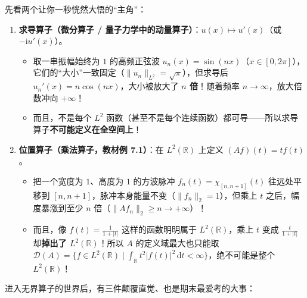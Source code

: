 \documentclass[11pt,a4paper]{article}
\providecommand{\tightlist}{\setlength{\itemsep}{1.8pt}\setlength{\parskip}{0pt}}
\begin{document}
先看两个让你一秒恍然大悟的``主角''：

\begin{enumerate}
\def\labelenumi{\arabic{enumi}.}
\tightlist
\item
  \textbf{求导算子（微分算子 / 量子力学中的动量算子）}：\(u(x) \mapsto u'(x)\)（或 \(-\mathrm{i} u'(x)\)）。

  \begin{itemize}
  \tightlist
  \item
    取一串振幅始终为 \(1\) 的高频正弦波 \(u_n(x) = \sin(nx)\)（\(x \in [0, 2\pi]\)），它们的``大小''一致固定（\(\|u_n\|_{L^2} = \sqrt{\pi}\)），但求导后 \(u_n'(x) = n\cos(nx)\)，大小被放大了 \textbf{\(n\) 倍}！随着频率 \(n \to \infty\)，放大倍数冲向 \(+\infty\)！
  \item
    而且，不是每个 \(L^2\) 函数（甚至不是每个连续函数）都可导——所以求导算子\textbf{不可能定义在全空间上}！
  \end{itemize}
\item
  \textbf{位置算子（乘法算子，教材例 7.1）}：在 \(L^2(\mathbb{R})\) 上定义 \((Af)(t) = t f(t)\)。

  \begin{itemize}
  \tightlist
  \item
    把一个宽度为 \(1\)、高度为 \(1\) 的方波脉冲 \(f_n(t) = \chi_{[n, n+1]}(t)\) 往远处平移到 \([n, n+1]\)，脉冲本身能量不变（\(\|f_n\|_2 = 1\)），但乘上 \(t\) 之后，幅度暴涨到至少 \(n\) 倍（\(\|Af_n\|_2 \ge n \to +\infty\)）！
  \item
    而且，像 \(f(t) = \frac{1}{1+|t|}\) 这样的函数明明属于 \(L^2(\mathbb{R})\)，乘上 \(t\) 变成 \(\frac{t}{1+|t|}\) 却\textbf{掉出了 \(L^2(\mathbb{R})\)}！所以 \(A\) 的定义域最大也只能取 \(\mathcal{D}(A) = \{f \in L^2(\mathbb{R}) \mid \int_{\mathbb{R}} t^2|f(t)|^2\,\mathrm{d}t < \infty\}\)，绝不可能是整个 \(L^2(\mathbb{R})\)！
  \end{itemize}
\end{enumerate}

进入无界算子的世界后，有三件颠覆直觉、也是期末最爱考的大事：
\end{document}
